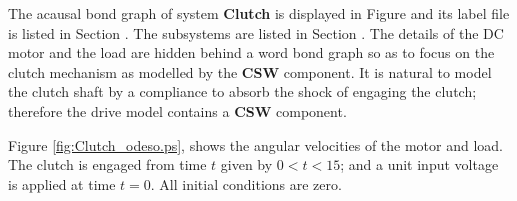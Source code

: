 

   The acausal bond graph of system \textbf{Clutch} is displayed in
   Figure  and its label file is listed in Section
   .  The subsystems are listed in Section
   .  The details of the DC motor and the load are
   hidden behind a word bond graph so as to focus on the clutch
   mechanism as modelled by the \textbf{CSW} component.
  It is natural to model the clutch shaft by a
compliance to absorb the shock of engaging the clutch; therefore the
drive model contains a \textbf{CSW} component.


Figure \ref{fig:Clutch_odeso.ps}, shows the angular velocities of the motor
and load.  The clutch is engaged from time $t$ given by $0<t<15$; and
a unit input voltage is applied at time $t=0$. All initial conditions
are zero.
